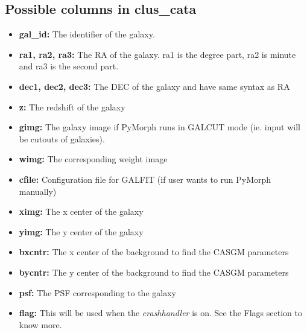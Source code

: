 \documentclass[a4paper,10pt]{article}
\begin{document}
\subsection{Possible columns in clus\_cata}
\label{cluscat}
\begin{itemize}
\item \textbf{ gal\_id:} The identifier of the galaxy.
\item \textbf{ ra1, ra2, ra3:} The RA of the galaxy. ra1 is the degree part, ra2 is minute and ra3
 is the second part.
\item \textbf{ dec1, dec2, dec3:} The DEC of the galaxy and have same syntax as RA
\item \textbf{ z:} The redshift of the galaxy
\item \textbf{ gimg:} The galaxy image if PyMorph runs in GALCUT mode (ie. input will be cutouts of galaxies).
\item \textbf{ wimg:} The corresponding weight image
\item \textbf{ cfile:} Configuration file for GALFIT (if user wants to run PyMorph manually)
\item \textbf{ ximg:} The x center of the galaxy
\item \textbf{ yimg:} The y center of the galaxy
\item \textbf{ bxcntr:} The x center of the background to find the CASGM parameters
\item \textbf{ bycntr:} The y center of the background to find the CASGM parameters
\item \textbf{ psf:} The PSF corresponding to the galaxy
\item \textbf{ flag:} This will be used when the\textit{ crashhandler} is on. See the Flags section to know more.
\end{itemize}
\end{document}
